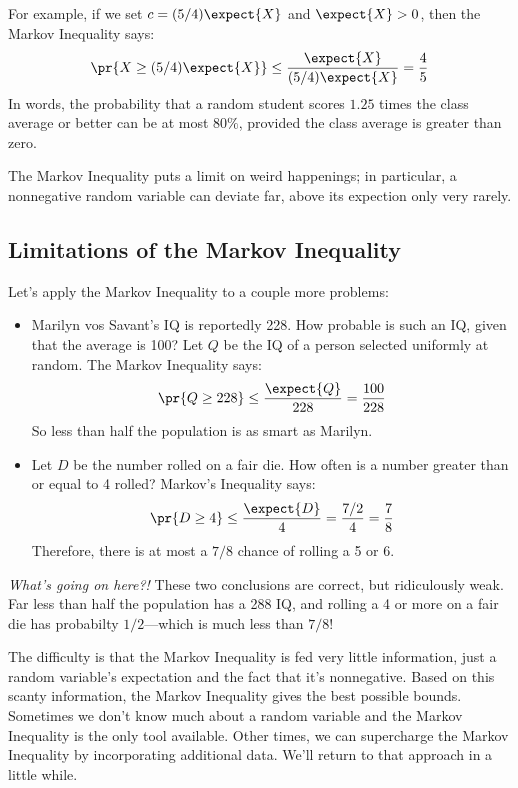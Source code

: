 \begin{editingnotes}
For example, if we set $c = (5/4) \expect{X}$ and $\expect{X} > 0$, then the
Markov Inequality says:
%
\[
\pr{X \geq (5/4) \expect{X}} \leq
\frac{\expect{X}}{(5/4)\expect{X}} = \frac{4}{5}
\]
%
In words, the probability that a random student scores $1.25$ times
the class average or better can be at most $80\%$, provided the class
average is greater than zero.

The Markov Inequality puts a limit on weird happenings; in particular,
a nonnegative random variable can deviate far, above its expection
only very rarely.

\subsection{Limitations of the Markov Inequality}

Let's apply the Markov Inequality to a couple more problems:

\begin{itemize}

\item Marilyn vos Savant's IQ is reportedly 228.  How probable is such
an IQ, given that the average is 100?  Let $Q$ be the IQ of a person
selected uniformly at random.  The Markov Inequality says:
%
\[
\pr{Q \geq 228} \leq \frac{\expect{Q}}{228} = \frac{100}{228}
\]
%
So less than half the population is as smart as Marilyn.

\item Let $D$ be the number rolled on a fair die.  How often is a
number greater than or equal to 4 rolled?  Markov's Inequality says:
%
\[
\pr{D \geq 4} \leq \frac{\expect{D}}{4} = \frac{7/2}{4} = \frac{7}{8}
\]
%
Therefore, there is at most a $7/8$ chance of rolling a 5 or 6.

\end{itemize}

\noindent \textit{What's going on here?!}  These two conclusions are
correct, but ridiculously weak.  Far less than half the population has
a 288 IQ, and rolling a 4 or more on a fair die has probabilty
$1/2$---which is much less than $7/8$!

The difficulty is that the Markov Inequality is fed very little
information, just a random variable's expectation and the fact that
it's nonnegative.  Based on this scanty information, the Markov
Inequality gives the best possible bounds.  Sometimes we don't know
much about a random variable and the Markov Inequality is the only
tool available.  Other times, we can supercharge the Markov Inequality
by incorporating additional data.  We'll return to that approach in a
little while.


\end{editingnotes}
